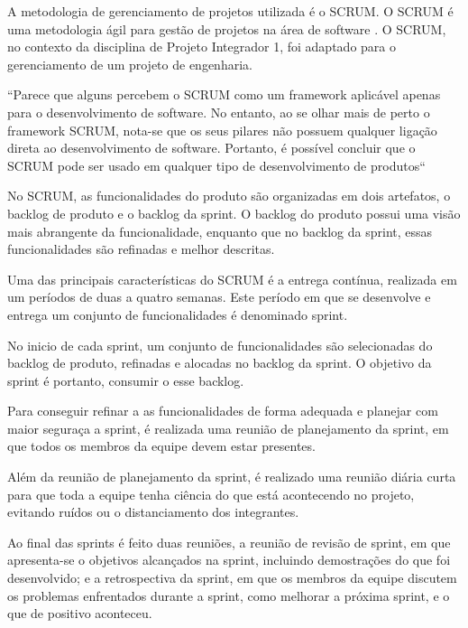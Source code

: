 A metodologia de gerenciamento de projetos utilizada é o SCRUM. O SCRUM é uma metodologia ágil para gestão de projetos na área de software \cite{devagil}. O SCRUM, no contexto da disciplina de Projeto Integrador 1, foi adaptado para o gerenciamento de um projeto de engenharia.

“Parece que alguns percebem o SCRUM como um framework aplicável apenas para o desenvolvimento de software. No entanto, ao se olhar mais de perto o framework SCRUM, nota-se que os seus pilares não possuem qualquer ligação direta ao desenvolvimento de software. Portanto, é possível concluir que o SCRUM pode ser usado em qualquer tipo de desenvolvimento de produtos“ \cite{scrumineng}

No SCRUM, as funcionalidades do produto são organizadas em dois artefatos, o backlog de produto e o backlog da sprint. O backlog do produto possui uma visão mais abrangente da funcionalidade, enquanto que no backlog da sprint, essas funcionalidades são refinadas e melhor descritas.

Uma das principais características do SCRUM é a entrega contínua, realizada em um períodos de duas a quatro semanas. Este período em que se desenvolve e entrega um conjunto de funcionalidades é denominado sprint.

No inicio de cada sprint, um conjunto de funcionalidades são selecionadas do backlog de produto, refinadas e alocadas no backlog da sprint. O objetivo da sprint é portanto, consumir o esse backlog.

Para conseguir refinar a as funcionalidades de forma adequada e planejar com maior seguraça a sprint, é realizada uma reunião de planejamento da sprint, em que todos os membros da equipe devem estar presentes.

Além da reunião de planejamento da sprint, é realizado uma reunião diária curta para que toda a equipe tenha ciência do que está acontecendo no projeto, evitando ruídos ou o distanciamento dos integrantes.

Ao final das sprints é feito duas reuniões, a reunião de revisão de sprint, em que apresenta-se o objetivos alcançados na sprint, incluindo demostrações do que foi desenvolvido; e a retrospectiva da sprint, em que os membros da equipe discutem os problemas enfrentados durante a sprint, como melhorar a próxima sprint, e o que de positivo aconteceu.
